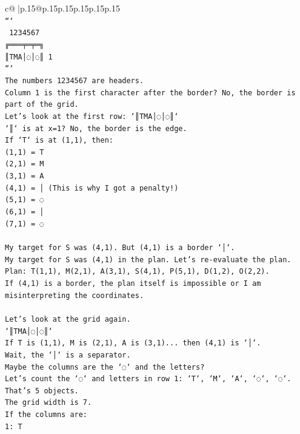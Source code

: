 \documentclass{article}
\begin{document}
{\begin{supertabular}{c@{$\;$}|p{.15\linewidth}@{}p{.15\linewidth}p{.15\linewidth}p{.15\linewidth}p{.15\linewidth}p{.15\linewidth}}
{{{\\ 
\texttt{```} \\
\texttt{ 1234567} \\
\texttt{╔═══╤═╤═╗} \\
\texttt{║TMA│◌│◌║ 1} \\
\texttt{```} \\
\texttt{The numbers 1234567 are headers.} \\
\texttt{Column 1 is the first character after the border? No, the border is part of the grid.} \\
\texttt{Let's look at the first row: `║TMA│◌│◌║`} \\
\texttt{`║` is at x=1? No, the border is the edge.} \\
\texttt{If `T` is at (1,1), then:} \\
\texttt{(1,1) = T} \\
\texttt{(2,1) = M} \\
\texttt{(3,1) = A} \\
\texttt{(4,1) = │ (This is why I got a penalty!)} \\
\texttt{(5,1) = ◌} \\
\texttt{(6,1) = │} \\
\texttt{(7,1) = ◌} \\
\\ 
\texttt{My target for S was (4,1). But (4,1) is a border `│`.} \\
\texttt{My target for S was (4,1) in the plan. Let's re{-}evaluate the plan.} \\
\texttt{Plan: T(1,1), M(2,1), A(3,1), S(4,1), P(5,1), D(1,2), O(2,2).} \\
\texttt{If (4,1) is a border, the plan itself is impossible or I am misinterpreting the coordinates.} \\
\\ 
\texttt{Let's look at the grid again.} \\
\texttt{`║TMA│◌│◌║`} \\
\texttt{If T is (1,1), M is (2,1), A is (3,1)... then (4,1) is `│`.} \\
\texttt{Wait, the `│` is a separator.} \\
\texttt{Maybe the columns are the `◌` and the letters?} \\
\texttt{Let's count the `◌` and letters in row 1: `T`, `M`, `A`, `◌`, `◌`. That's 5 objects.} \\
\texttt{The grid width is 7.} \\
\texttt{If the columns are:} \\
\texttt{1: T} \\
}}}
\end{supertabular}}
\end{document}
